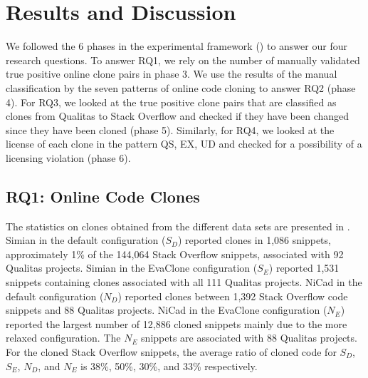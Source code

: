 \documentclass[sigconf,review, anonymous]{acmart}
\newcommand\FIXME[1]{\textbf{FIXME: #1}}
\begin{document}
\section{Results and Discussion}

We followed the 6 phases in the experimental framework ()
to answer our four research questions. 
To answer RQ1, we rely on the number of manually validated true positive online clone pairs
in phase 3. We use the results of the manual classification by the
seven patterns of online code cloning to answer RQ2 (phase 4). 
For RQ3, we looked at the true positive clone pairs that are classified 
as clones from Qualitas to Stack Overflow and
checked if they have been changed since they have been
cloned (phase 5). Similarly, for RQ4, we looked at the license of each clone in the pattern 
QS, EX, UD and checked for a possibility of a licensing violation (phase 6).

\subsection{RQ1: Online Code Clones} 

The statistics on clones obtained from the different data sets are
presented in . Simian in the default configuration
($S_D$) reported clones in 1,086 snippets, approximately 1\% of the
144,064 Stack Overflow snippets, associated with 92 Qualitas
projects. Simian in the EvaClone configuration ($S_E$) reported 1,531
snippets containing clones associated with all 111 Qualitas
projects. NiCad in the default configuration ($N_D$) reported clones
between 1,392 Stack Overflow code snippets and 88 Qualitas
projects. NiCad in the EvaClone configuration ($N_E$) reported the
largest number of 12,886 cloned snippets mainly due to the more
relaxed configuration. The $N_E$ snippets are associated with 88
Qualitas projects.  For the cloned Stack Overflow snippets, the
average ratio of cloned code for $S_D$, $S_E$, $N_D$, and $N_E$ is
38\%, 50\%, 30\%, and 33\% respectively.

\end{document}
